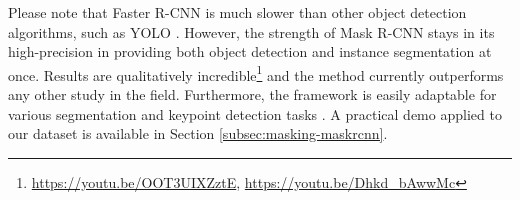 Please note that Faster R-CNN is much slower \cite{medium_rcnn} than other object detection algorithms, such as YOLO \cite{redmon2016look}. However, the strength of Mask R-CNN stays in its high-precision in providing both object detection and instance segmentation at once. Results are qualitatively incredible\footnote{\url{https://youtu.be/OOT3UIXZztE}, \url{https://youtu.be/Dhkd_bAwwMc}} and the method currently outperforms any other study in the field. Furthermore, the framework is easily adaptable for various segmentation and keypoint detection tasks \cite{he2018mask} \cite{MaskRCNN_matterport} \cite{maskrcnn_explanation}. A practical demo applied to our dataset is available in Section \ref{subsec:masking-maskrcnn}.





